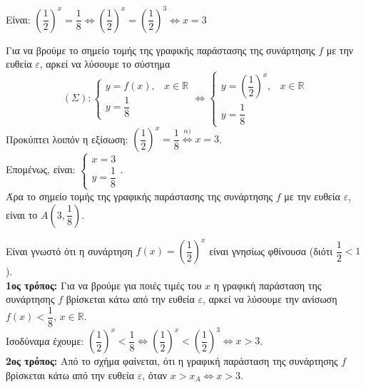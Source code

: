 \begin{alist}
\item Είναι: $\left(\dfrac{1}{2}\right)^x = \dfrac{1}{8} \Leftrightarrow \left(\dfrac{1}{2}\right)^x = \left(\dfrac{1}{2}\right)^3 \Leftrightarrow x = 3$
\item Για να βρούμε το σημείο τομής της γραφικής παράστασης της συνάρτησης $f$ με την ευθεία $\varepsilon$, αρκεί να λύσουμε το σύστημα
\[(\Sigma): \begin{cases} y = f(x), & x \in \mathbb{R} \\ y = \dfrac{1}{8} \end{cases} \Leftrightarrow \begin{cases} y = \left(\dfrac{1}{2}\right)^x, & x \in \mathbb{R} \\ y = \dfrac{1}{8} \end{cases}\]
Προκύπτει λοιπόν η εξίσωση: $\left(\dfrac{1}{2}\right)^x = \dfrac{1}{8} \overset{\alpha)}{\Longleftrightarrow} x = 3$. \\
Επομένως, είναι: $\begin{cases} x = 3 \\ y = \dfrac{1}{8} \end{cases}$. \\
Άρα το σημείο τομής της γραφικής παράστασης της συνάρτησης $f$ με την ευθεία $\varepsilon$, είναι το $A\left(3, \dfrac{1}{8}\right)$.
\item Είναι γνωστό ότι η συνάρτηση $f(x) = \left(\dfrac{1}{2}\right)^x$ είναι γνησίως φθίνουσα (διότι $\dfrac{1}{2} < 1$). \\
\textbf{1ος τρόπος:} Για να βρούμε για ποιές τιμές του $x$ η γραφική παράσταση της συνάρτησης $f$ βρίσκεται κάτω από την ευθεία $\varepsilon$, αρκεί να λύσουμε την ανίσωση $f(x) < \dfrac{1}{8}$, $x \in \mathbb{R}$. \\
Ισοδύναμα έχουμε: $\left(\dfrac{1}{2}\right)^x < \dfrac{1}{8} \Leftrightarrow \left(\dfrac{1}{2}\right)^x < \left(\dfrac{1}{2}\right)^3 \Leftrightarrow x > 3$. \\
\textbf{2ος τρόπος:} Από το σχήμα φαίνεται, ότι η γραφική παράσταση της συνάρτησης $f$ βρίσκεται κάτω από την ευθεία $\varepsilon$, όταν $x > x_A \Leftrightarrow x > 3$.
\end{alist}

